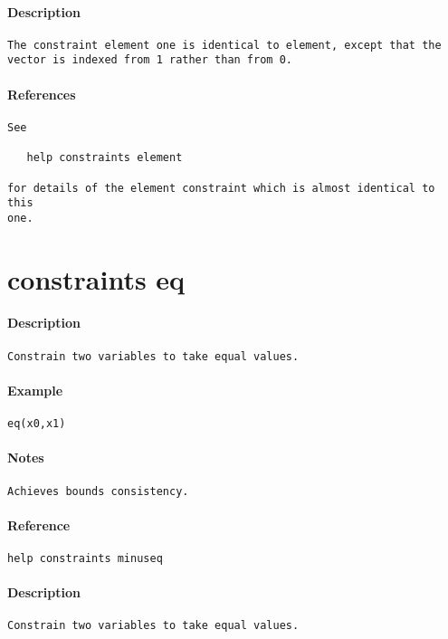 \paragraph{Description}
{\footnotesize
\begin{verbatim}
The constraint element one is identical to element, except that the
vector is indexed from 1 rather than from 0.
\end{verbatim}
}
\paragraph{References}
{\footnotesize
\begin{verbatim}
See

   help constraints element

for details of the element constraint which is almost identical to this
one.
\end{verbatim}
}
\section{constraints eq}
\paragraph{Description}
{\footnotesize
\begin{verbatim}
Constrain two variables to take equal values.
\end{verbatim}
}
\paragraph{Example}
{\footnotesize
\begin{verbatim}
eq(x0,x1)
\end{verbatim}
}
\paragraph{Notes}
{\footnotesize
\begin{verbatim}
Achieves bounds consistency.
\end{verbatim}
}
\paragraph{Reference}
{\footnotesize
\begin{verbatim}
help constraints minuseq
\end{verbatim}
}
\paragraph{Description}
{\footnotesize
\begin{verbatim}
Constrain two variables to take equal values.
\end{verbatim}
}
